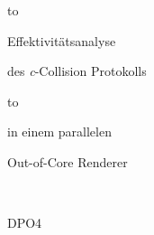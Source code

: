 \begin{titlepage}
\parskip0pt
\selectfont

\vspace*{-0.75cm}

\hbox to 

\vspace{1.2cm}

\begin{center}
\begin{Large}\thesistype \end{Large}\vspace{1cm}
 
\dmseries

\huge{

Effektivit\"{a}tsanalyse

des \textit{c}-Collision Protokolls

\hbox to 

in einem parallelen

Out-of-Core Renderer
} 
\end{center}

\vfill

\begin{center}
\begin{Large}\dmseries\thesisauthor\end{Large} 


\end{center}


\newpage~\newpage
\thispagestyle{empty}

\parskip12pt

\begin{center}
  \begin{Large}\thesistype \end{Large}  


  \begin{normalsize}DPO4 \end{normalsize} \bigskip 



\end{center}
\end{titlepage}
